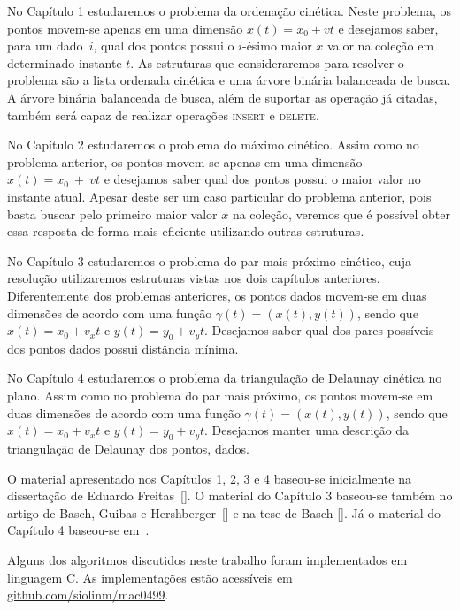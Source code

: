 No Capítulo 1 estudaremos o problema da ordenação cinética.
Neste problema, os pontos movem-se apenas em uma dimensão $x(t) = x_0 + vt$ e
desejamos saber, para um dado~$i$, qual dos pontos possui o $i$-ésimo maior $x$ valor na coleção em
determinado instante $t$.
As estruturas que consideraremos para resolver o problema são a lista
ordenada cinética e uma árvore binária balanceada de busca.
A árvore binária balanceada de busca, além de suportar as operação já citadas,
também será capaz de realizar operações \textsc{insert} e \textsc{delete}.

No Capítulo 2 estudaremos o problema do máximo cinético.
Assim como no problema anterior, os pontos movem-se apenas em uma
dimensão $x(t) = x_0~+~vt$ e desejamos saber qual dos pontos possui o maior valor
no instante atual.
Apesar deste ser um caso particular do problema anterior, pois basta buscar pelo primeiro
maior valor $x$ na coleção, veremos que é possível obter essa resposta de forma mais
eficiente utilizando outras estruturas.

No Capítulo 3 estudaremos o problema do par mais próximo cinético, cuja resolução
utilizaremos estruturas vistas nos dois capítulos anteriores.
Diferentemente dos problemas anteriores, os pontos dados movem-se em duas dimensões
de acordo com uma função $\gamma(t) = (x(t), y(t))$, sendo que $x(t) = x_0 + v_x t$ e
$y(t) = y_0 + v_y t$.
Desejamos saber qual dos pares possíveis dos pontos dados possui distância mínima.

No Capítulo 4 estudaremos o problema da triangulação de Delaunay cinética no plano.
Assim como no problema do par mais próximo, os pontos movem-se em duas dimensões de acordo com uma
função $\gamma(t) = (x(t), y(t))$, sendo que $x(t) = x_0 + v_x t$ e $y(t) = y_0 + v_y t$.
Desejamos manter uma descrição da triangulação de Delaunay dos pontos, dados.

O material apresentado nos Capítulos 1, 2, 3 e 4 baseou-se inicialmente na dissertação de Eduardo
Freitas~[\cite{eduardo}].
O material do Capítulo 3 baseou-se também no artigo de Basch, Guibas e
Hershberger~[\cite{BASCH19991}] e na tese de Basch [\cite{basch-thesis}].
Já o material do Capítulo 4 baseou-se em~\cite{computationalgeometry}.

Alguns dos algoritmos discutidos neste trabalho foram implementados em linguagem C\@.
As implementações estão acessíveis em
\href{https://github.com/siolinm/mac0499/tree/main/implementacao}{github.com/siolinm/mac0499}.


